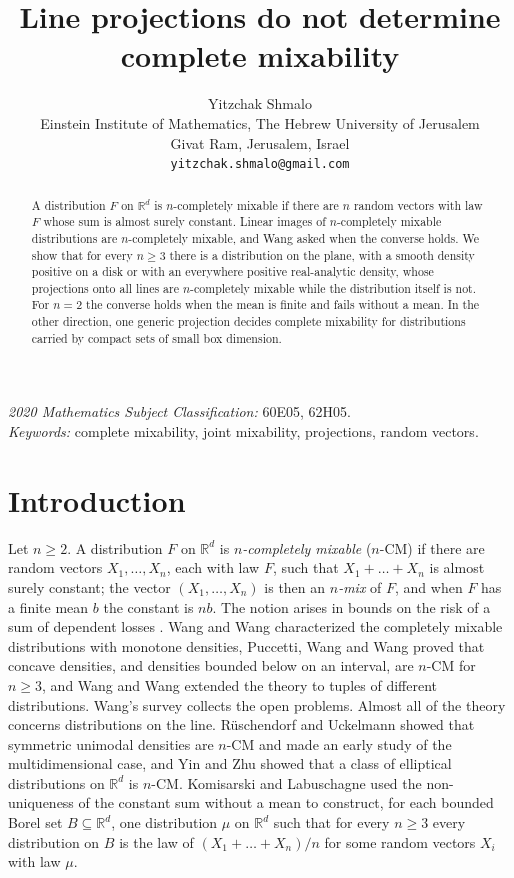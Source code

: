 \documentclass[11pt]{article}
\title{Line projections do not determine complete mixability}
\author{Yitzchak Shmalo\\
Einstein Institute of Mathematics, The Hebrew University of Jerusalem\\
Givat Ram, Jerusalem, Israel\\
\texttt{yitzchak.shmalo@gmail.com}}
\date{}
\theoremstyle{definition}
\theoremstyle{remark}
\newcommand{\R}{\mathbb{R}}
\begin{document}
\maketitle

\begin{abstract}
A distribution $F$ on $\R^d$ is $n$-completely mixable if there are $n$ random vectors with law $F$ whose sum is
almost surely constant. Linear images of $n$-completely mixable distributions are $n$-completely mixable, and Wang
asked when the converse holds. We show that for every $n\ge 3$ there is a distribution on the plane, with a smooth
density positive on a disk or with an everywhere positive real-analytic density, whose projections onto all lines
are $n$-completely mixable while the distribution itself is not. For $n=2$ the converse holds when the mean is
finite and fails without a mean. In the other direction, one generic projection decides complete mixability for
distributions carried by compact sets of small box dimension.
\end{abstract}

\noindent\textit{2020 Mathematics Subject Classification:} 60E05, 62H05.\\
\textit{Keywords:} complete mixability, joint mixability, projections, random vectors.

\section{Introduction}

Let $n\ge 2$. A distribution $F$ on $\R^d$ is \emph{$n$-completely mixable} ($n$-CM) if there are random vectors
$X_1,\dots,X_n$, each with law $F$, such that $X_1+\dots+X_n$ is almost surely constant; the vector
$(X_1,\dots,X_n)$ is then an \emph{$n$-mix} of $F$, and when $F$ has a finite mean $b$ the constant is $nb$. The
notion arises in bounds on the risk of a sum of dependent losses \cite{PWW13}. Wang and Wang \cite{WW11} characterized the
completely mixable distributions with monotone densities, Puccetti, Wang and Wang \cite{PWW12,PWW13} proved
that concave densities, and densities bounded below on an interval, are $n$-CM for $n\ge3$, and Wang and Wang
\cite{WW16} extended the theory to tuples of different distributions. Wang's survey \cite{Wang} collects the open
problems. Almost all of the theory concerns distributions on the line. R\"uschendorf and Uckelmann \cite{RU}
showed that symmetric unimodal densities are $n$-CM and made an early study of the multidimensional case, and Yin
and Zhu \cite[Theorem~4.1]{YZ} showed that a class of elliptical distributions on $\R^d$ is $n$-CM. Komisarski and Labuschagne \cite{KL} used the
non-uniqueness of the constant sum without a mean to construct, for each bounded Borel set $B\subseteq\R^d$, one
distribution $\mu$ on $\R^d$ such that for every $n\ge3$ every distribution on $B$ is the law of
$(X_1+\dots+X_n)/n$ for some random vectors $X_i$ with law $\mu$.
\end{document}
